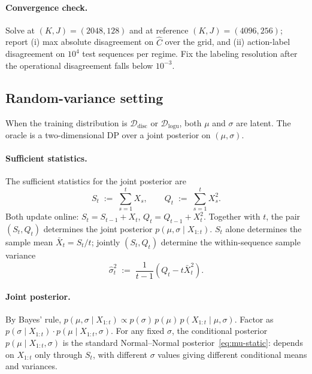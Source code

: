 \documentclass[11pt]{article}
\begin{document}
\paragraph{Convergence check.} Solve at $(K, J) = (2048, 128)$ and at reference $(K, J) = (4096, 256)$; report (i) max absolute disagreement on $\widehat C$ over the grid, and (ii) action-label disagreement on $10^4$ test sequences per regime. Fix the labeling resolution after the operational disagreement falls below $10^{-3}$.

\subsection{Random-variance setting}
\label{sec:oracle-random}

When the training distribution is $\mathcal{D}_{\mathrm{disc}}$ or $\mathcal{D}_{\mathrm{logu}}$, both $\mu$ and $\sigma$ are latent. The oracle is a two-dimensional DP over a joint posterior on $(\mu, \sigma)$.

\paragraph{Sufficient statistics.} The sufficient statistics for the joint posterior are
\begin{equation}
\label{eq:S-Q-defs}
S_t \;:=\; \sum_{s=1}^t X_s,
\qquad
Q_t \;:=\; \sum_{s=1}^t X_s^2.
\end{equation}
Both update online: $S_t = S_{t-1} + X_t$, $Q_t = Q_{t-1} + X_t^2$. Together with $t$, the pair $(S_t, Q_t)$ determines the joint posterior $p(\mu, \sigma \mid X_{1:t})$. $S_t$ alone determines the sample mean $\bar X_t = S_t/t$; jointly $(S_t, Q_t)$ determine the within-sequence sample variance
\[
\hat\sigma_t^2 \;:=\; \frac{1}{t-1}(Q_t - t\bar X_t^2).
\]

\paragraph{Joint posterior.} By Bayes' rule, $p(\mu, \sigma \mid X_{1:t}) \propto p(\sigma)\, p(\mu)\, p(X_{1:t} \mid \mu, \sigma)$. Factor as $p(\sigma \mid X_{1:t}) \cdot p(\mu \mid X_{1:t}, \sigma)$. For any fixed $\sigma$, the conditional posterior $p(\mu \mid X_{1:t}, \sigma)$ is the standard Normal--Normal posterior~\eqref{eq:mu-static}: depends on $X_{1:t}$ only through $S_t$, with different $\sigma$ values giving different conditional means and variances.
\end{document}

